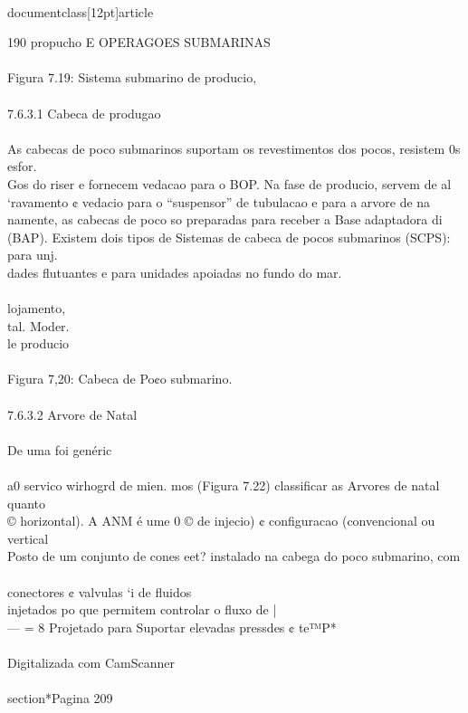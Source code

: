 \\documentclass[12pt]{article}
\begin{document}
190 propucho E OPERAGOES SUBMARINAS\\
\\
Figura 7.19: Sistema submarino de producio,\\
\\
7.6.3.1 Cabeca de produgao\\
\\
As cabecas de poco submarinos suportam os revestimentos dos pocos, resistem 0s esfor.\\
Gos do riser e fornecem vedacao para o BOP. Na fase de producio, servem de al\\
‘ravamento ¢ vedacio para o “suspensor” de tubulacao e para a arvore de na\\
namente, as cabecas de poco so preparadas para receber a Base adaptadora di\\
(BAP). Existem dois tipos de Sistemas de cabeca de pocos submarinos (SCPS): para unj.\\
dades flutuantes e para unidades apoiadas no fundo do mar.\\
\\
lojamento,\\
tal. Moder.\\
le producio\\
\\
Figura 7,20: Cabeca de Po¢o submarino.\\
\\
7.6.3.2 Arvore de Natal\\
\\
De uma foi genéric\\
\\
a0 servico wirhogrd de mien. mos (Figura 7.22) classificar as Arvores de natal quanto\\
© horizontal). A ANM é ume 0 © de injecio) ¢ configuracao (convencional ou vertical\\
Posto de um conjunto de cones eet? instalado na cabega do poco submarino, com\\
\\
conectores ¢ valvulas ‘i de fluidos\\
injetados po que permitem controlar o fluxo de |\\
— = 8 Projetado para Suportar elevadas pressdes ¢ te™P*\\
\\
Digitalizada com CamScanner\\

\\section*{Pagina 209}
\end{document}
